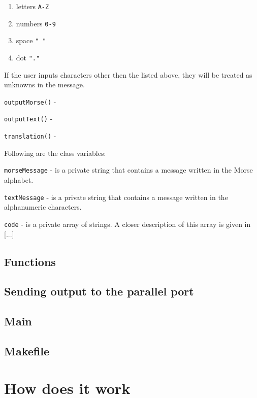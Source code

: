 \documentclass[12pt]{report}
\begin{document}
\begin{enumerate}
\item letters \verb|A-Z|
\item numbers \verb|0-9|
\item space \verb|" "|
\item dot \verb|"."|
\end{enumerate}

If the user inputs characters other then the listed above, they will be treated as unknowns in the message.


\verb|outputMorse()| - 



\verb|outputText()| - 



\verb|translation()| - 


Following are the class variables:

\verb|morseMessage| - is a private string that contains a message written in the Morse alphabet.


\verb|textMessage| - is a private string that contains a message written in the alphanumeric characters.


\verb|code| - is a private array of strings. A closer description of this array is given in [...]


\subsection{Functions}










\subsection{Sending output to the parallel port}



\subsection{Main}



\subsection{Makefile}



\section{How does it work}
\end{document}
